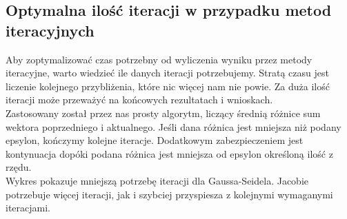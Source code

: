 \documentclass[8pt]{article}
\begin{document}
\subsection*{Optymalna ilość iteracji w przypadku metod iteracyjnych}
Aby zoptymalizować czas potrzebny od wyliczenia wyniku przez metody iteracyjne, warto wiedzieć ile danych iteracji potrzebujemy. Stratą czasu jest liczenie kolejnego przybliżenia, które nic więcej nam nie powie. Za duża ilość iteracji może przeważyć na końcowych rezultatach i wnioskach.\\
Zastosowany został przez nas prosty algorytm, liczący średnią różnice sum wektora poprzedniego i aktualnego. Jeśli dana różnica jest mniejsza niż podany epsylon, kończymy kolejne iteracje. Dodatkowym zabezpieczeniem jest kontynuacja dopóki podana różnica jest mniejsza od epsylon określoną ilość z rzędu.\\
Wykres pokazuje mniejszą potrzebę iteracji dla Gaussa-Seidela. Jacobie potrzebuje więcej iteracji, jak i szybciej przyspiesza z kolejnymi wymaganymi iteracjami.
\begin{center}
\end{center}
\end{document}
